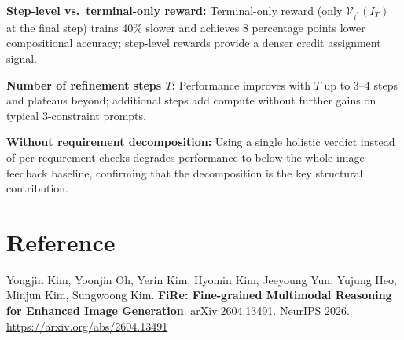 \documentclass[10pt,twocolumn]{article}
\begin{document}
\textbf{Step-level vs.\ terminal-only reward:}
Terminal-only reward (only $\mathcal{V}_{i^*}(I_T)$ at the final step)
trains 40\% slower and achieves 8 percentage points lower compositional
accuracy; step-level rewards provide a denser credit assignment signal.

\textbf{Number of refinement steps $T$:}
Performance improves with $T$ up to 3--4 steps and plateaus beyond; additional
steps add compute without further gains on typical 3-constraint prompts.

\textbf{Without requirement decomposition:}
Using a single holistic verdict instead of per-requirement checks degrades
performance to below the whole-image feedback baseline, confirming that
the decomposition is the key structural contribution.

\section*{Reference}

Yongjin Kim, Yoonjin Oh, Yerin Kim, Hyomin Kim, Jeeyoung Yun, Yujung Heo,
Minjun Kim, Sungwoong Kim.
\textbf{FiRe: Fine-grained Multimodal Reasoning for Enhanced Image Generation}.
arXiv:2604.13491. NeurIPS 2026.
\url{https://arxiv.org/abs/2604.13491}
\end{document}
